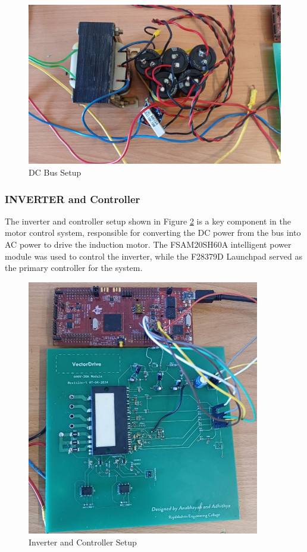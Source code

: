 \begin{figure}
	\centering
	\includegraphics[width=6in]{sections/section6/images/hardwareSetup/DC bus rectifier transformer.jpg}
	\caption{DC Bus Setup}
	\label{fig:DC Bus Setup}
\end{figure}


\subsubsection{INVERTER and Controller}

The inverter and controller setup shown in Figure \ref{fig:Inverter and Controller Setup} is a key component in the motor control system, responsible for converting the DC power from the bus into AC power to drive the induction motor. The FSAM20SH60A intelligent power module was used to control the inverter, while the F28379D Launchpad served as the primary controller for the system.

\begin{figure}
	\centering
	\includegraphics[width=4in]{sections/section6/images/hardwareSetup/IPM and C2000.jpg}
	\caption{Inverter and Controller Setup}
	\label{fig:Inverter and Controller Setup}
\end{figure}

